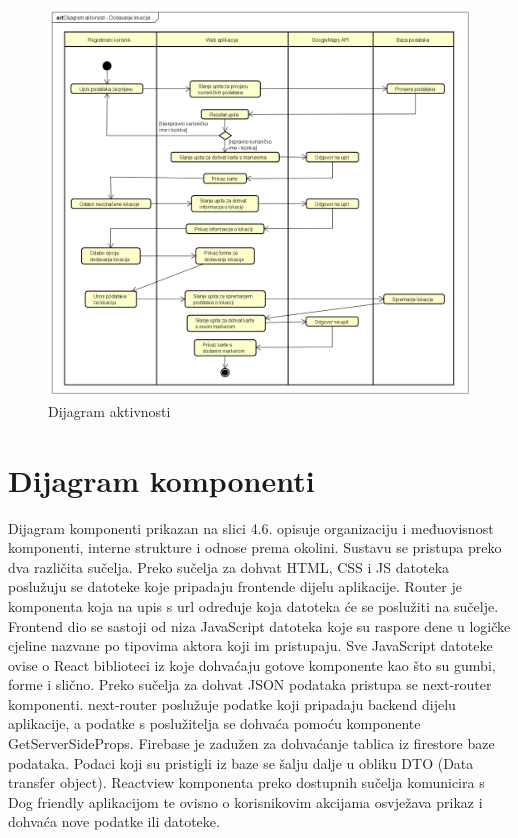 			
			\begin{figure}[H]
			\includegraphics[scale=0.4]{slike/DijagramAktivnosti.png}
			\centering
			\caption{Dijagram aktivnosti}
			\label{fig:promjene}
				\end{figure}

            \section{Dijagram komponenti}

			Dijagram komponenti prikazan na slici 4.6. opisuje organizaciju i međuovisnost komponenti, interne strukture i odnose prema okolini. Sustavu se pristupa preko dva različita sučelja. Preko sučelja za dohvat HTML, CSS i JS datoteka poslužuju se datoteke koje pripadaju frontende dijelu aplikacije. Router je komponenta koja na upis s url određuje koja datoteka će se poslužiti na sučelje. Frontend dio se sastoji od niza JavaScript datoteka koje su raspore dene u logičke cjeline nazvane po tipovima aktora koji im pristupaju. Sve JavaScript datoteke ovise o React biblioteci iz koje dohvaćaju gotove komponente kao što su gumbi, forme i slično. Preko sučelja za dohvat JSON podataka pristupa se next-router komponenti. next-router poslužuje podatke koji pripadaju backend dijelu aplikacije, a podatke s poslužitelja se dohvaća pomoću komponente GetServerSideProps. Firebase je zadužen za dohvaćanje tablica iz firestore baze podataka. Podaci koji su pristigli iz baze se šalju dalje u obliku DTO (Data transfer object). Reactview komponenta preko dostupnih sučelja komunicira s Dog friendly aplikacijom te ovisno o korisnikovim akcijama osvježava prikaz i dohvaća nove podatke ili datoteke.
			
